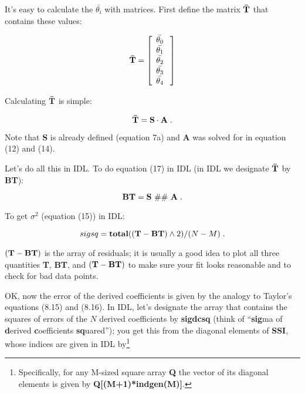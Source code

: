 	It's easy to calculate the $\bar{\theta_i}$ with matrices. First
define the matrix ${\bf \bar T}$ that contains these values:

\begin{eqnarray}
{\bf \bar T} = \left[
\begin{array}{c} 
{\bar{\theta_0}} \\ 
{\bar{\theta_1}} \\ 
{\bar{\theta_2}} \\ 
{\bar{\theta_3}} \\ 
{\bar{\theta_4}} \\ 
\end{array} 
\; \right]
\end{eqnarray} 

{\noindent} Calculating ${\bf \bar T}$ is simple:

\begin{equation}
{\bf \bar T} = {\bf S \cdot A} \; . 
\end{equation}

\noindent Note that {\bf S} is already defined (equation 7a) and {\bf A}
was solved for in equation (12) and (14).  

	Let's do all this in IDL.  To do equation (17) in IDL (in IDL we
designate ${\bf \bar T}$ by {\bf BT}):

\begin{equation}
\label{bteqn}
{\bf BT} = {\bf S \ \#\# \ A} \; .
\end{equation}

\noindent To get $\sigma^2$ (equation (15)) in IDL:

\begin{equation}
\label{sigsq}
sigsq = {\bf total}( ({\bf T - BT}) \wedge 2 )/(N-M) \; . 
\end{equation}

\noindent $({\bf T - BT})$ is the array of residuals; it is usually a
good idea to plot all three quantities {\bf T}, {\bf BT}, and $({\bf T -
BT})$ to make sure your fit looks reasonable and to check for bad data
points. 

	OK, now the error of the derived coefficients is given by the
analogy to Taylor's equations (8.15) and (8.16).  In IDL, let's
designate the array that contains the squares of errors of the $N$
derived coefficients by {\bf sigdcsq} (think of ``{\bf sig}ma of {\bf
d}erived {\bf c}oefficients {\bf sq}uared''); you get this from the
diagonal elements of {\bf SSI}, whose indices are given in IDL
by\footnote{Specifically, for any M-sized square array {\bf Q} the
vector of its diagonal elements is given by {\bf Q[(M+1)*indgen(M)]}.}

